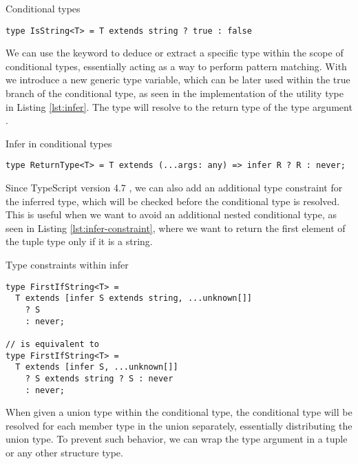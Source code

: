 \begin{listing}[ht]
  \caption{Conditional types}\label{lst:conditional-types}
  \begin{verbatim}
type IsString<T> = T extends string ? true : false
\end{verbatim}
\end{listing}

We can use the  keyword to deduce or extract a specific type within the scope of conditional types, essentially acting as a way to perform pattern matching. With  we introduce a new generic type variable, which can be later used within the true branch of the conditional type, as seen in the implementation of the  utility type in Listing \ref{lst:infer}. The  type will resolve to the return type of the type argument .

\begin{listing}[ht]
  \caption{Infer in conditional types}\label{lst:infer}
  \begin{verbatim}
type ReturnType<T> = T extends (...args: any) => infer R ? R : never;
\end{verbatim}
\end{listing}

Since TypeScript version 4.7 \cite{rosenwasserAnnouncingTypeScript2022}, we can also add an additional type constraint for the inferred type, which will be checked before the conditional type is resolved. This is useful when we want to avoid an additional nested conditional type, as seen in Listing \ref{lst:infer-constraint}, where we want to return the first element of the tuple type only if it is a string.

\begin{listing}[ht]
  \caption{Type constraints within infer}\label{lst:infer-constraint}
  \begin{verbatim}
type FirstIfString<T> =
  T extends [infer S extends string, ...unknown[]]
    ? S
    : never;

// is equivalent to 
type FirstIfString<T> =
  T extends [infer S, ...unknown[]]
    ? S extends string ? S : never
    : never;
\end{verbatim}
\end{listing}

When given a union type within the conditional type, the conditional type will be resolved for each member type in the union separately, essentially distributing the union type. To prevent such behavior, we can wrap the type argument in a tuple or any other structure type.

